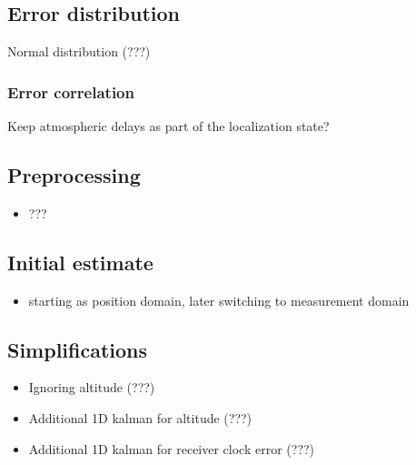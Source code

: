 \subsection{Error distribution}
Normal distribution (???)

\subsubsection{Error correlation}
\label{sec:measurement-domain-correlation}
Keep atmospheric delays as part of the localization state?

\subsection{Preprocessing}
\begin{itemize}
\item ???
\end{itemize}

\subsection{Initial estimate}
\begin{itemize}
\item starting as position domain, later switching to measurement domain
\end{itemize}

\subsection{Simplifications}
\begin{itemize}
\item Ignoring altitude (???)
\item Additional 1D kalman for altitude (???)
\item Additional 1D kalman for receiver clock error (???)
\end{itemize}

